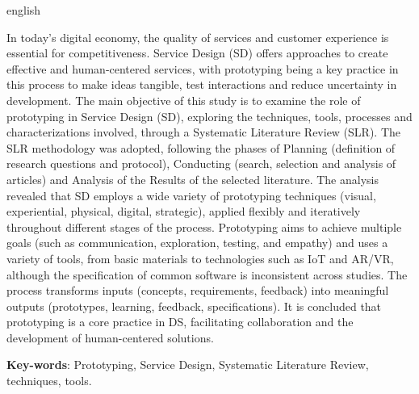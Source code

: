 \begin{resumo}[Abstract]
 \begin{otherlanguage*}{english}
 	
In today’s digital economy, the quality of services and customer experience is essential for competitiveness. Service Design (SD) offers approaches to create effective and human-centered services, with prototyping being a key practice in this process to make ideas tangible, test interactions and reduce uncertainty in development.
The main objective of this study is to examine the role of prototyping in Service Design (SD), exploring the techniques, tools, processes and characterizations involved, through a Systematic Literature Review (SLR).
The SLR methodology was adopted, following the phases of Planning (definition of research questions and protocol), Conducting (search, selection and analysis of articles) and Analysis of the Results of the selected literature.
The analysis revealed that SD employs a wide variety of prototyping techniques (visual, experiential, physical, digital, strategic), applied flexibly and iteratively throughout different stages of the process. Prototyping aims to achieve multiple goals (such as communication, exploration, testing, and empathy) and uses a variety of tools, from basic materials to technologies such as IoT and AR/VR, although the specification of common software is inconsistent across studies. The process transforms inputs (concepts, requirements, feedback) into meaningful outputs (prototypes, learning, feedback, specifications).
It is concluded that prototyping is a core practice in DS, facilitating collaboration and the development of human-centered solutions.

   \vspace{\onelineskip}
 
   \noindent 
   \textbf{Key-words}: Prototyping, Service Design, Systematic Literature Review, techniques, tools.
 \end{otherlanguage*}
\end{resumo}
